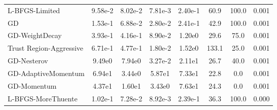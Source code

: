 \documentclass{article}
\begin{document}
\begin{table}[htbp]
{\begin{tabular}{p{2.5cm}*{7}{c}}
L-BFGS-Limited & 9.58e-2 & 8.02e-2 & 7.81e-3 & 2.40e-1 & 60.9 & 100.0 & 0.001 \\
GD & 1.53e-1 & 6.88e-2 & 2.80e-2 & 2.41e-1 & 42.9 & 100.0 & 0.001 \\
GD-WeightDecay & 3.93e-1 & 4.16e-1 & 8.90e-2 & 1.20e0 & 29.6 & 75.0 & 0.001 \\
Trust Region-Aggressive & 6.71e-1 & 4.77e-1 & 1.80e-2 & 1.52e0 & 133.1 & 25.0 & 0.001 \\
GD-Nesterov & 9.49e0 & 7.94e0 & 3.27e-2 & 2.11e1 & 26.7 & 40.0 & 0.001 \\
GD-AdaptiveMomentum & 6.94e1 & 3.44e0 & 5.87e1 & 7.33e1 & 22.8 & 0.0 & 0.001 \\
GD-Momentum & 4.37e1 & 1.60e1 & 3.43e0 & 7.63e1 & 24.3 & 0.0 & 0.001 \\
L-BFGS-MoreThuente & 1.02e-1 & 7.28e-2 & 8.92e-3 & 2.39e-1 & 36.3 & 100.0 & 0.000 \\
\bottomrule
\end{tabular}
}
\end{table}
\end{document}
